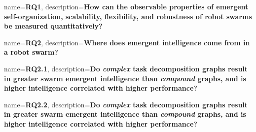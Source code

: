 {
  name={\textbf{RQ1}},
  description={\textbf{How can the observable properties of emergent
      self-organization, scalability, flexibility, and robustness of robot
      swarms be measured quantitatively?}}
}

{
  name={\textbf{RQ2}},
  description={\textbf{Where does emergent intelligence come from in a robot swarm?}}
}

{
  name={\textbf{RQ2.1}},
  description={\textbf{Do \emph{complex} task decomposition graphs result in
      greater swarm emergent intelligence than \emph{compound} graphs, and is
      higher intelligence correlated with higher
      performance?}}
}

{
  name={\textbf{RQ2.2}},
  description={\textbf{Do \emph{complex} task decomposition graphs result in
      greater swarm emergent intelligence than \emph{compound} graphs, and is
      higher intelligence correlated with higher
      performance?}}
}
